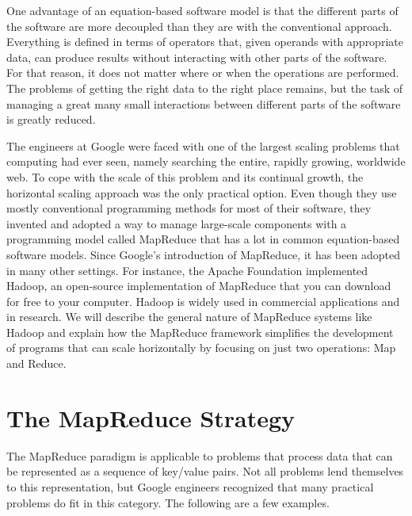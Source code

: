 One advantage of an equation-based software model
is that the different parts of the software are more decoupled
than they are with the conventional approach.
Everything is defined in terms of operators
that, given operands with appropriate data,
can produce results without
interacting with other parts of the software.
For that reason, it does not matter where or when
the operations are performed.
The problems of getting the right data to the right place
remains, but the task of managing a great many small interactions
between different parts of the software is greatly reduced.

The engineers at Google were faced with one of the largest
scaling problems that computing had ever seen,
namely searching the entire, rapidly growing, worldwide web.
To cope with the scale of this problem and its continual growth,
the horizontal scaling approach was the only practical option.
Even though they use mostly conventional programming methods
for most of their software,
they invented and adopted a way to manage large-scale components
with a programming model called MapReduce
that has a lot in common equation-based software models.
Since Google's introduction of MapReduce,
it has been adopted in many other settings.  For
instance, the Apache Foundation
implemented Hadoop, an
open-source implementation of MapReduce that you can
download for free to your computer.
Hadoop is widely used in commercial applications and in research.
We will describe the general nature of
MapReduce systems like Hadoop
and explain how the MapReduce framework simplifies the
development of programs that can scale horizontally by
focusing on just two operations: Map and Reduce.

\section{The MapReduce Strategy}

The \textsf{MapReduce} paradigm
is applicable to problems that process
data that can be represented as a sequence of
key/value pairs.
Not all problems lend themselves to this representation,
but Google engineers recognized that many practical
problems do fit in this category.
The following are a few examples.

